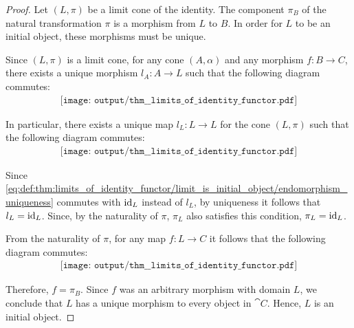 \begin{proof}
   Let \( (L, \pi) \) be a limit cone of the identity. The component \( \pi_B \) of the natural transformation \( \pi \) is a morphism from \( L \) to \( B \). In order for \( L \) to be an initial object, these morphisms must be unique.

  Since \( (L, \pi) \) is a limit cone, for any cone \( (A, \alpha) \) and any morphism \( f: B \to C \), there exists a unique morphism \( l_A: A \to L \) such that the following diagram commutes:
  \begin{equation}\label{eq:def:thm:limits_of_identity_functor/limit_is_initial_object/limit}
    \begin{aligned}
      \texttt{[image: output/thm\_\_limits\_of\_identity\_functor.pdf]}
    \end{aligned}
  \end{equation}

  In particular, there exists a unique map \( l_L: L \to L \) for the cone \( (L, \pi) \) such that the following diagram commutes:
  \begin{equation}\label{eq:def:thm:limits_of_identity_functor/limit_is_initial_object/endomorphism_uniqueness}
    \begin{aligned}
      \texttt{[image: output/thm\_\_limits\_of\_identity\_functor.pdf]}
    \end{aligned}
  \end{equation}

  Since \eqref{eq:def:thm:limits_of_identity_functor/limit_is_initial_object/endomorphism_uniqueness} commutes with \( \operatorname{id}_L \) instead of \( l_L \), by uniqueness it follows that \( l_L = \operatorname{id}_L \). Since, by the naturality of \( \pi \), \( \pi_L \) also satisfies this condition, \( \pi_L = \operatorname{id}_L \).

  From the naturality of \( \pi \), for any map \( f: L \to C \) it follows that the following diagram commutes:
  \begin{equation}\label{eq:def:thm:limits_of_identity_functor/limit_is_initial_object/morphism_uniqueness}
    \begin{aligned}
      \texttt{[image: output/thm\_\_limits\_of\_identity\_functor.pdf]}
    \end{aligned}
  \end{equation}

  Therefore, \( f = \pi_B \). Since \( f \) was an arbitrary morphism with domain \( L \), we conclude that \( L \) has a unique morphism to every object in \( \cat{C} \). Hence, \( L \) is an initial object.
\end{proof}

